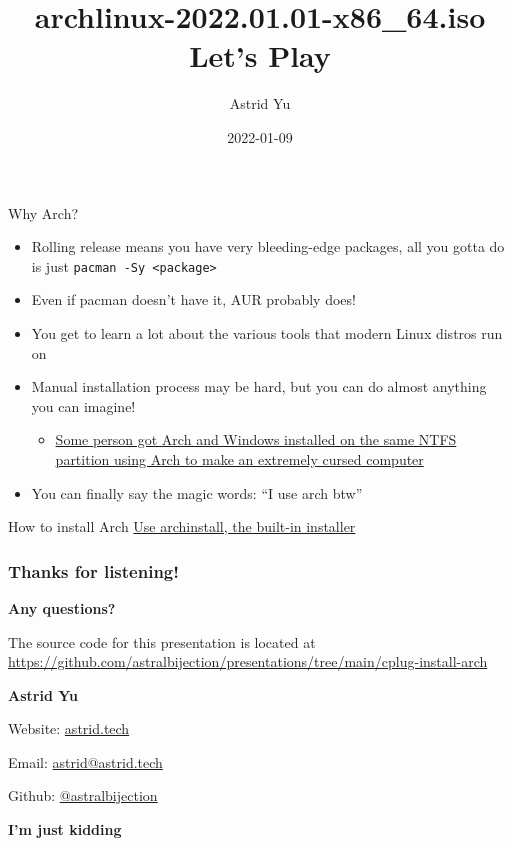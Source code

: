 \documentclass{beamer}
\title{archlinux-2022.01.01-x86\_64.iso Let's Play}
\author{Astrid Yu}
\institute{Cal Poly Linux Users Group}
\date{2022-01-09}
\begin{document}
\frame{\titlepage}

\begin{frame}{Why Arch?}
    \begin{itemize}
        \item Rolling release means you have very bleeding-edge packages, all you gotta do is just \texttt{pacman -Sy <package>}
        \item Even if pacman doesn't have it, AUR probably does!
        \item You get to learn a lot about the various tools that modern Linux distros run on
        \item Manual installation process may be hard, but you can do almost anything you can imagine!
            \begin{itemize}
                \item \href{https://gist.github.com/motorailgun/cc2c573f253d0893f429a165b5f851ee}{Some person got Arch and Windows installed on the same NTFS partition using Arch to make an extremely cursed computer}
            \end{itemize} \pause
        \item You can finally say the magic words: ``I use arch btw''
    \end{itemize}
\end{frame}

\begin{frame}{How to install Arch}
    \Huge
    \href{https://wiki.archlinux.org/title/Archinstall}{Use archinstall, the built-in installer}
\end{frame}

\newcommand{\thankyouframe}{
    \frametitle{Thanks for listening!}
    
    {\Huge \textbf{Any questions?}}

    {\small The source code for this presentation is located at \url{https://github.com/astralbijection/presentations/tree/main/cplug-install-arch}}

    \vspace{1cm}

    {\large \textbf{Astrid Yu}}

    Website: \href{https://astrid.tech}{astrid.tech}

    Email: \href{mailto:astrid@astrid.tech}{astrid@astrid.tech}
    
    Github: \href{https://github.com/astralbijection}{@astralbijection}
}

\begin{frame}
    \thankyouframe \pause

    \centering
    \huge
    \textbf{I'm just kidding}
\end{frame}
\end{document}
